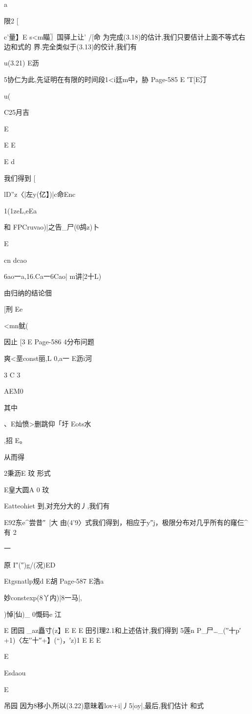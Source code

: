 {{a

限2
[

c'量】E
s<m瞄〗国驿上让'
/[命
为完成(3.18)的估计,我们只要佶计上面不等式右边和式的
界.完全类似于(3.13)的佼计,我们有

u(3.21)
E沥

5协仁为此,先证明在有限的时间段1<i廷m中，胁
Page-585
E
′T[E汀

u(

C25月吉

E

E
E

E
d

我们得到
[

lD”z〈|左y(亿】)|c命Enc

1(1zeL,eEa

和
FPCruvao)|之告_尸(0鸪z)卜

E

cn
dcao

6ao一a,16.Ca一6Cao|
m讲[2十L)

由归纳的结论佃%

[刑
Ee

<mn鱿(

因止
[3
E
Page-586
4分布问题

爽<垩const丽,L
0,a一
E沥i河

3
C
3

AEM0

其中

、E灿愤>删跳仰「圩
Eots水

,招
E。

从而得

2秉沥E
玟
形式

E皇大圆A
0
玟

Eatteohiet
到,对充分大的丿,我们有

E92东e^尝昔″~[大
由(4'9〉式我们得到，相应于y″j，极限分布对几乎所有的窿仨^有
2

一

原
I″(″)g/(况)ED

Etgsnatlp规d
E胡
Page-587
E浩a

妙constexp(8丫内)|8一马|,

)悼[仙)_
0慨码e
江

E
团园
_az矗寸(z】E
E
E
田引理2.1和上述佶计,我们得到
5莲n
P_尸…_(′′十p′+1)〈左′′十′′+】(“)，′z)1
E
E
E

E

Esdaou

E

吊园
因为8移小,所以(3.22)意昧着lov+i|丿5|oy|,最后,我们估计
和式

}}
